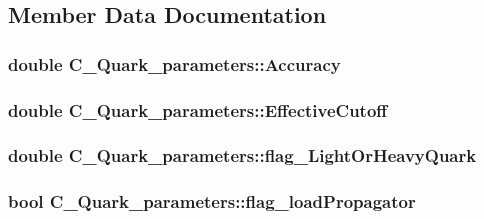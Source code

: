 \subsection{Member Data Documentation}
\hypertarget{class_c___quark__parameters_ac1e6225033703e6a438930d107df16a3}{
\subsubsection[{Accuracy}]{\setlength{\rightskip}{0pt plus 5cm}double C\-\_\-\-Quark\-\_\-parameters\-::\-Accuracy}}\label{class_c___quark__parameters_ac1e6225033703e6a438930d107df16a3}
\hypertarget{class_c___quark__parameters_a1648469ed688b8d25c1ce6a622b90ef7}{
\subsubsection[{Effective\-Cutoff}]{\setlength{\rightskip}{0pt plus 5cm}double C\-\_\-\-Quark\-\_\-parameters\-::\-Effective\-Cutoff}}\label{class_c___quark__parameters_a1648469ed688b8d25c1ce6a622b90ef7}
\hypertarget{class_c___quark__parameters_ab8e384ddf5a6d722a768e7179c4e0c2e}{
\subsubsection[{flag\-\_\-\-Light\-Or\-Heavy\-Quark}]{\setlength{\rightskip}{0pt plus 5cm}double C\-\_\-\-Quark\-\_\-parameters\-::flag\-\_\-\-Light\-Or\-Heavy\-Quark}}\label{class_c___quark__parameters_ab8e384ddf5a6d722a768e7179c4e0c2e}
\hypertarget{class_c___quark__parameters_adb9de54db5fdb4d9d326e0d7cfba38a5}{
\subsubsection[{flag\-\_\-load\-Propagator}]{\setlength{\rightskip}{0pt plus 5cm}bool C\-\_\-\-Quark\-\_\-parameters\-::flag\-\_\-load\-Propagator}}\label{class_c___quark__parameters_adb9de54db5fdb4d9d326e0d7cfba38a5}
